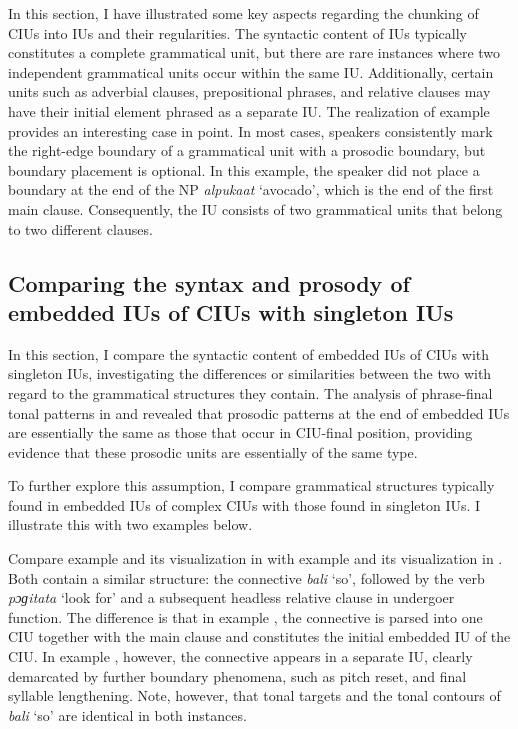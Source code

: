 In this section, I have illustrated some key aspects regarding the chunking of CIUs into IUs and their regularities. The syntactic content of IUs typically constitutes a complete grammatical unit, but there are rare instances where two independent grammatical units occur within the same IU. Additionally, certain units such as adverbial clauses, prepositional phrases, and relative clauses may have their initial element phrased as a separate IU. The realization of example  provides an interesting case in point. In most cases, speakers consistently mark the right-edge boundary of a grammatical unit with a prosodic boundary, but boundary placement is optional. In this example, the speaker did not place a boundary at the end of the NP \textit{alpukaat} `avocado', which is the end of the first main clause. Consequently, the IU consists of two grammatical units that belong to two different clauses.


\subsection[Comparing syntax and prosody]{Comparing the syntax and prosody of embedded IUs  of CIUs with singleton IUs}\label{sec:comparing-ius-with-ips}


In this section, I compare the syntactic content of embedded IUs of CIUs with singleton IUs, investigating the differences or similarities between the two with regard to the grammatical structures they contain. The analysis of phrase-final tonal patterns in   and   revealed that prosodic patterns at the end of embedded IUs are essentially the same as those that occur in CIU-final position, providing evidence that these prosodic units are essentially of the same type.

To further explore this assumption, I compare grammatical structures typically found in embedded IUs of complex CIUs with those found in singleton IUs. I illustrate this with two examples below. 

Compare example  and its visualization in   with example  and its visualization in  . Both contain a similar structure: the connective \textit{bali} `so', followed by the verb \textit{pɔɡitata} `look for' and a subsequent headless relative clause in undergoer function.  The difference is that in example , the connective is parsed into one CIU together with the main clause and constitutes the initial embedded IU of the CIU.  In example , however, the connective appears in a separate IU, clearly demarcated by further boundary phenomena, such as pitch reset, and final syllable lengthening. Note, however, that tonal targets and the tonal contours of \textit{bali} `so' are identical in both instances.







